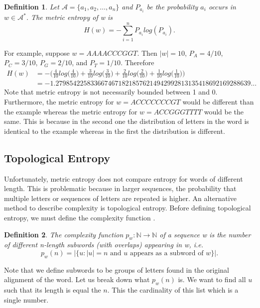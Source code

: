 \documentclass{article}
\newtheorem{definition}{Definition}
\begin{document}
\begin{definition}
    Let $\mathcal{A} = \{a_1, a_2, \dots, a_n\}$ and $P_{a_i}$ be the probability $a_i$ occurs in $w \in \mathcal{A}^*$.
    The metric entropy of w is 
    \begin{equation*}
        H(w) = -\sum^n_{i=1} P_{a_i} log(P_{a_i}).
    \end{equation*}
\end{definition}

For example, suppose $w = AAAACCCGGT$.
Then $|w| = 10$, $P_A = 4/10$, $P_C = 3/10$, $P_G = 2/10$, and $P_T = 1/10$. 
Therefore 
\begin{align*}
    H(w) &= -\bigg(\frac{4}{10}log\bigg(\frac{4}{10}\bigg) + \frac{3}{10}log\bigg(\frac{3}{10}\bigg) + \frac{2}{10}log\bigg(\frac{2}{10}\bigg) + \frac{1}{10}log\bigg(\frac{1}{10}\bigg)\bigg) \\
    &= -1.27985422583366746718218576214942992813135418692169288639...
\end{align*}
\noindent Note that metric entropy is not necessarily bounded between 1 and 0. 
Furthermore, the metric entropy for $w = ACCCCCCCGT$ would be different than the example whereas the metric entropy for $w = ACCGGGTTTT$ would be the same.
This is because in the second one the distribution of letters in the word is identical to the example whereas in the first the distribution is different.

\subsection{Topological Entropy}
Unfortunately, metric entropy does not compare entropy for words of different length.
This is problematic because in larger sequences, the probability that multiple letters or sequences of letters are repeated is higher.
An alternative method to describe complexity is topological entropy.
Before defining topological entropy, we must define the complexity function \cite{1}.

\begin{definition}
    The complexity function $p_w : \mathbb{N} \rightarrow \mathbb{N}$ of a sequence w is the number of different n-length subwords (with overlaps) appearing in w, i.e.
    \begin{equation*}
        p_w(n) = |\{u:|u| = \text{$n$ and $u$ appears as a subword of $w$}\}|.
    \end{equation*}
\end{definition}
\noindent Note that we define subwords to be groups of letters found in the original alignment of the word.
Let us break down what $p_w(n)$ is.
We want to find all $u$ such that its length is equal the $n$.
This the cardinality of this list which is a single number.
\end{document}
